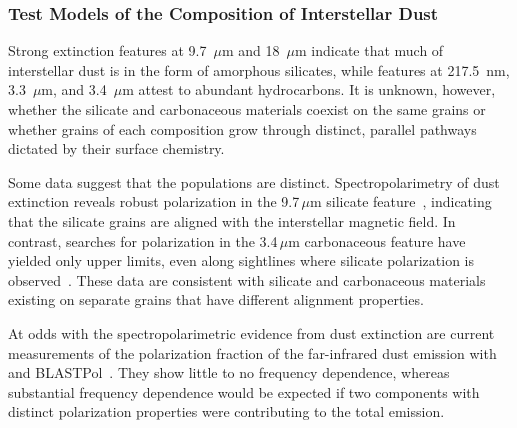 \documentclass[PICOReport.tex]{subfiles}
\begin{document}
\subsubsection{Test Models of the Composition of Interstellar Dust}
\label{sec:test_composition_models}

Strong extinction features at 9.7~$\mu$m and 18~$\mu$m indicate that much of interstellar dust is in the form of amorphous silicates, while features at 217.5~nm, 3.3~$\mu$m, and 3.4~$\mu$m attest to abundant hydrocarbons. It is unknown, however, whether the silicate and carbonaceous materials coexist on the same grains or whether grains of each composition grow through distinct, parallel pathways dictated by their surface chemistry. 


Some data suggest that the populations are distinct. Spectropolarimetry of dust extinction reveals robust polarization in the 9.7\,$\mu$m silicate feature~\citep[e.g.,][]{Smith2000}, indicating that the silicate grains are aligned with the interstellar magnetic field. In contrast, searches for polarization in the 3.4\,$\mu$m carbonaceous feature have yielded only upper limits, even along sightlines where silicate polarization is observed~\citep{Chiar2006,Mason2007}. These data are consistent with silicate and carbonaceous materials existing on separate grains that have different alignment properties. 

At odds with the spectropolarimetric evidence from dust extinction are current measurements of the polarization fraction of the far-infrared dust emission with \planck~\citep{Planck_Int_XXII} and BLASTPol~\citep{Ashton2018}. They show little to no frequency dependence, whereas substantial frequency dependence would be expected if two components with distinct polarization properties were contributing to the total emission. 
\end{document}
